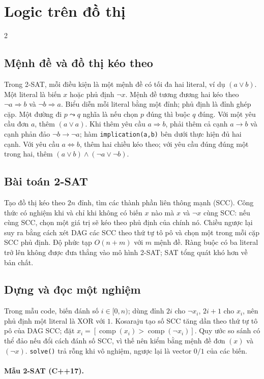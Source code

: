 \section{Logic trên đồ thị}
\begingroup\small
\begin{multicols}{2}
\subsection{Mệnh đề và đồ thị kéo theo}
Trong 2-SAT, mỗi điều kiện là một mệnh đề có tối đa hai literal,
ví dụ $(a\lor b)$. Một literal là biến $x$ hoặc phủ định
$\neg x$. Mệnh đề tương đương hai kéo theo
$\neg a\Rightarrow b$ và $\neg b\Rightarrow a$.
Biểu diễn mỗi literal bằng một đỉnh; phủ định là đỉnh ghép cặp.
Một đường đi $p\leadsto q$ nghĩa là nếu chọn $p$ đúng thì
buộc $q$ đúng. Với một yêu cầu đơn $a$, thêm $(a\lor a)$.
Khi thêm yêu cầu $a\Rightarrow b$, phải thêm cả cạnh
$a\to b$ và cạnh phản đảo $\neg b\to\neg a$;
hàm \texttt{implication(a,b)} bên dưới thực hiện đủ hai cạnh.
Với yêu cầu $a\Leftrightarrow b$, thêm hai chiều kéo theo;
với yêu cầu đúng đúng một trong hai, thêm
$(a\lor b)\land(\neg a\lor\neg b)$.

\subsection{Bài toán 2-SAT}
Tạo đồ thị kéo theo $2n$ đỉnh, tìm các thành phần liên thông
mạnh (SCC). Công thức có nghiệm khi và chỉ khi không có biến
$x$ nào mà $x$ và $\neg x$ cùng SCC: nếu cùng SCC, chọn một
giá trị sẽ kéo theo phủ định của chính nó. Chiều ngược lại
suy ra bằng cách xét DAG các SCC theo thứ tự tô pô và chọn
một trong mỗi cặp SCC phủ định. Độ phức tạp $O(n+m)$ với
$m$ mệnh đề. Ràng buộc có ba literal trở lên không được đưa
thẳng vào mô hình 2-SAT; SAT tổng quát khó hơn về bản chất.

\subsection{Dựng và đọc một nghiệm}
Trong mẫu code, biến đánh số $i\in[0,n)$; dùng đỉnh $2i$
cho $\neg x_i$, $2i+1$ cho $x_i$,
nên phủ định một literal là XOR với $1$. Kosaraju tạo số SCC
tăng dần theo thứ tự tô pô của DAG SCC; đặt
$x_i=[\operatorname{comp}(x_i)>
\operatorname{comp}(\neg x_i)]$.
Quy ước so sánh có thể đảo nếu đổi cách đánh số SCC, vì thế
nên kiểm bằng mệnh đề đơn $(x)$ và $(\neg x)$.
\texttt{solve()} trả rỗng khi vô nghiệm, ngược lại là vector
$0/1$ của các biến.

\paragraph{Mẫu 2-SAT (C++17).}
\end{multicols}
\endgroup
